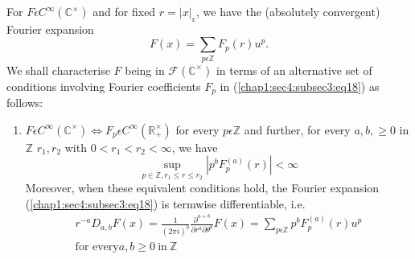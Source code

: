  For $F\epsilon C^\infty(\mathbb{C}^\times)$ and for fixed
 $r=|x|_{\mathbb{c}}$, we have the (absolutely convergent) Fourier
 expansion 
\begin{equation*}
  F(x)=\sum\limits_{p\epsilon\mathbb{Z}}F_{p}(r)u^p.
  \tag{18}\label{chap1:sec4:subsec3:eq18} 
\end{equation*}
 We shall characterise $F$ being in $\mathscr{F}(\mathbb{C}^\times)$ in
 terms of an alternative set of conditions involving Fourier
 coefficients $F_{p}$ in (\ref{chap1:sec4:subsec3:eq18}) as follows:  
\begin{enumerate}
\renewcommand{\theenumi}{\Roman{enumi}}
\renewcommand{\labelenumi}{(\theenumi)}
\item $F\epsilon C^\infty(\mathbb{C}^\times)\Leftrightarrow F_{p}\epsilon
C^\infty(\mathbb{R}_+^\times)$ for every $p\epsilon \mathbb{Z}$ and
further, for every $a,b,\ge0$ in $\mathbb{Z}$ $r_1,r_2$ with
$0<r_{1}<r_{2}<\infty$, we have
\begin{equation*}
{\displaystyle{\mathop{\sup}_{p\in \mathbb{Z},r_{1}\leq r\leq
      r_{2}}}}|p^{b}F^{(a)}_{p}(r)|<\infty\tag{19}\label{chap1:sec4:subsec3:eq19}
\end{equation*}
Moreover, when these equivalent conditions hold, the Fourier expansion
(\ref{chap1:sec4:subsec3:eq18}) is termwise differentiable,
i.e. 
\begin{multline*}
r^{-a}D_{a,b}F(x)=\frac{1}{(2\pi i)^b}\frac{\partial^{a+b}}{\partial
  r^{a}\partial \theta^{b}}F(x)=\sum\limits_{p\epsilon
  \mathbb{Z}}p^{b} F_{p}^{(a)}(r)u^p\\ 
\text{for every} a,b\ge 0
~\text{in}~ \mathbb{Z}\tag{20}\label{chap1:sec4:subsec3:eq20} 
\end{multline*}


\end{enumerate}
